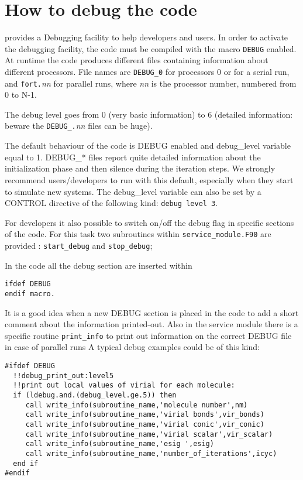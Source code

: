 \section{How to debug the code }

\PR provides a Debugging facility to help developers and users.
In order to activate the debugging facility, the code must be compiled
with the macro \verb=DEBUG= enabled. 
At runtime the code produces different files containing information
about different processors. File names are \verb=DEBUG_0= for processors 0 
or for a serial run, and \verb=fort.={\it nn} for parallel runs, 
where {\it nn} is the processor number, numbered from 0 to N-1.

The debug level goes from 0 (very basic information) to 6 (detailed
information: beware the \verb=DEBUG_.={\it nn} files can be huge).

The default behaviour of the code is DEBUG enabled and debug\_level
variable equal to 1. DEBUG\_* files report quite detailed information about
the initialization phase and then silence during the iteration steps. 
We strongly recommend  users/developers to run with this default,
especially when they start to simulate new systems.
The debug\_level variable can also be set by a CONTROL directive of the
following kind: \verb=debug level 3=.\

\par
For developers it also possible to switch on/off the debug flag in specific
sections of the code. For this task two subroutines within  
\verb=service_module.F90= are provided : \verb=start_debug= 
and \verb=stop_debug=;

In the code all the debug section are inserted within
\begin{verbatim}
ifdef DEBUG
endif macro.
\end{verbatim}

It is a good idea when a new DEBUG section is placed in the code to
add a short comment about the information printed-out. 
Also in the service module there is a specific routine \verb=print_info=  to
print out information on the correct DEBUG file in case of parallel runs    
A typical debug examples could be of this kind:

\begin{verbatim}
#ifdef DEBUG
  !!debug_print_out:level5
  !!print out local values of virial for each molecule:
  if (ldebug.and.(debug_level.ge.5)) then 
     call write_info(subroutine_name,'molecule number',nm)
     call write_info(subroutine_name,'virial bonds',vir_bonds)
     call write_info(subroutine_name,'virial conic',vir_conic)
     call write_info(subroutine_name,'virial scalar',vir_scalar)
     call write_info(subroutine_name,'esig ',esig)
     call write_info(subroutine_name,'number_of_iterations',icyc)
  end if
#endif
\end{verbatim}

